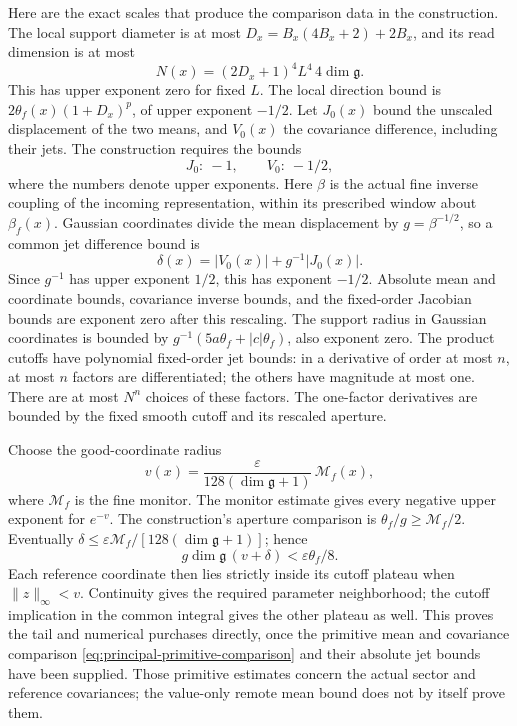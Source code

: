 Here are the exact scales that produce the comparison data in the
construction. The local support diameter is at most
$D_x=B_x(4B_x+2)+2B_x$, and its read dimension is at most
\[
             N(x)=(2D_x+1)^4L^4\,4\dim\mathfrak g.
\]
This has upper exponent zero for fixed $L$.
The local direction bound is
$2\theta_f(x)(1+D_x)^p$, of upper exponent $-1/2$.
Let $J_0(x)$ bound the unscaled displacement of the two means,
and $V_0(x)$ the covariance difference, including their jets.
The construction requires the bounds
\begin{equation}\label{eq:principal-primitive-comparison}
 J_0:\ -1,\qquad V_0:\ -1/2,
\end{equation}
where the numbers denote upper exponents. Here $\beta$ is the
actual fine inverse coupling of the incoming representation,
within its prescribed window about $\beta_f(x)$.
Gaussian coordinates divide the mean displacement by
$g=\beta^{-1/2}$, so a common
jet difference bound is
\[
             \delta(x)=|V_0(x)|+g^{-1}|J_0(x)|.
\]
Since $g^{-1}$ has upper exponent $1/2$, this has exponent
$-1/2$. Absolute mean and coordinate bounds, covariance inverse
bounds, and the fixed-order Jacobian bounds are exponent zero
after this rescaling. The support radius in Gaussian coordinates
is bounded by
$g^{-1}(5a\theta_f+|c|\theta_f)$, also exponent zero.
The product cutoffs have polynomial fixed-order jet bounds: in a
derivative of order at most $n$, at most $n$ factors are
differentiated; the others have magnitude at most one. There are
at most $N^n$ choices of these factors. The one-factor derivatives
are bounded by the fixed smooth cutoff and its rescaled aperture.

Choose the good-coordinate radius
\[
 v(x)=\frac{\varepsilon}{128(\dim\mathfrak g+1)}\,\mathcal M_f(x),
\]
where $\mathcal M_f$ is the fine monitor. The monitor estimate
gives every negative upper exponent for $e^{-v}$.
The construction's aperture comparison is
$\theta_f/g\ge\mathcal M_f/2$. Eventually
$\delta\le\varepsilon\mathcal M_f/[128(\dim\mathfrak g+1)]$;
hence
\[
 g\dim\mathfrak g\,(v+\delta)<\varepsilon\theta_f/8.
\]
Each reference coordinate then lies strictly inside its cutoff
plateau when $\|z\|_\infty<v$. Continuity gives the required
parameter neighborhood; the cutoff implication in the common
integral gives the other plateau as well. This proves the tail
and numerical purchases directly, once the primitive mean and
covariance comparison \eqref{eq:principal-primitive-comparison}
and their absolute jet bounds have been supplied. Those primitive
estimates concern the actual sector and reference covariances;
the value-only remote mean bound does not by itself prove them.

